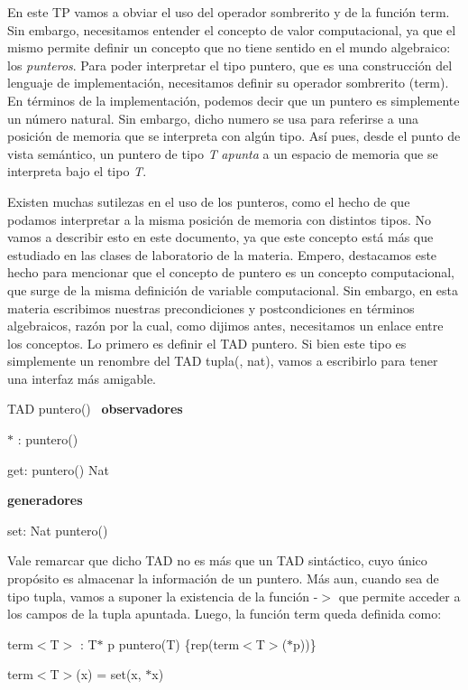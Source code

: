En este TP vamos a obviar el uso del operador sombrerito y de la función term. Sin embargo, necesitamos entender el concepto de valor computacional, ya que el mismo permite definir un concepto que no tiene sentido en el mundo algebraico\+: los {\itshape punteros}. Para poder interpretar el tipo puntero, que es una construcción del lenguaje de implementación, necesitamos definir su operador sombrerito (term). En términos de la implementación, podemos decir que un puntero es simplemente un número natural. Sin embargo, dicho numero se usa para referirse a una posición de memoria que se interpreta con algún tipo. Así pues, desde el punto de vista semántico, un puntero de tipo {\itshape T} {\itshape apunta} a un espacio de memoria que se interpreta bajo el tipo {\itshape T}.

Existen muchas sutilezas en el uso de los punteros, como el hecho de que podamos interpretar a la misma posición de memoria con distintos tipos. No vamos a describir esto en este documento, ya que este concepto está más que estudiado en las clases de laboratorio de la materia. Empero, destacamos este hecho para mencionar que el concepto de puntero es un concepto computacional, que surge de la misma definición de variable computacional. Sin embargo, en esta materia escribimos nuestras precondiciones y postcondiciones en términos algebraicos, razón por la cual, como dijimos antes, necesitamos un enlace entre los conceptos. Lo primero es definir el T\+AD puntero. Si bien este tipo es simplemente un renombre del T\+AD tupla(, nat), vamos a escribirlo para tener una interfaz más amigable.

T\+AD puntero()~\newline
{\bfseries observadores} ~\newline

\begin{DoxyItemize}
\item $\ast$ \+: puntero()  ~\newline

\item get\+: puntero()  Nat
\end{DoxyItemize}

{\bfseries generadores} ~\newline

\begin{DoxyItemize}
\item set\+: Nat    puntero()
\end{DoxyItemize}

Vale remarcar que dicho T\+AD no es más que un T\+AD sintáctico, cuyo único propósito es almacenar la información de un puntero. Más aun, cuando  sea de tipo tupla, vamos a suponer la existencia de la función -\/$>$ que permite acceder a los campos de la tupla apuntada. Luego, la función term queda definida como\+:
\begin{DoxyItemize}
\item term$<$\+T$>$ \+: T$\ast$ p  puntero(\+T) \{rep(term$<$\+T$>$($\ast$p))\}
\item term$<$\+T$>$(x) = set(x, $\ast$x)
\end{DoxyItemize}

